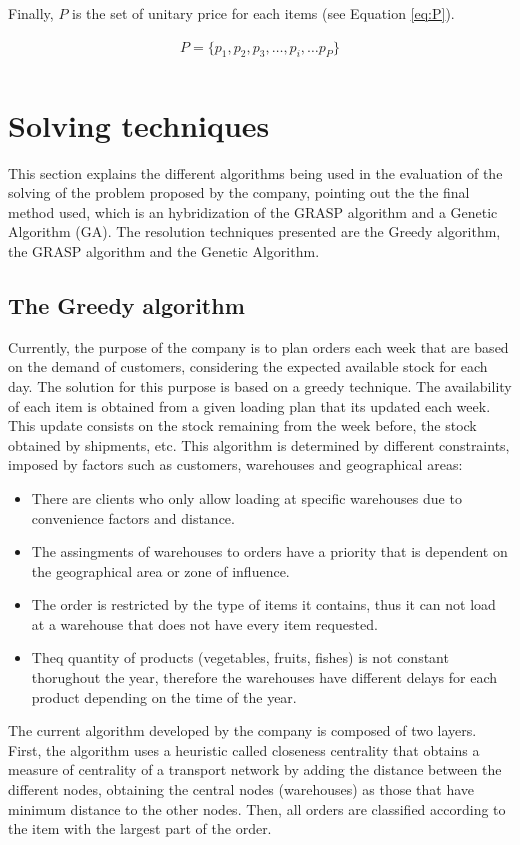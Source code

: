 \documentclass[letterpaper]{article} %
\begin{document}
Finally, $P$ is the set of unitary price for each items (see Equation \ref{eq:P}).

\begin{equation}
    \begin{aligned}\label{eq:P}
        P = \{p_1, p_2, p_3, \dots, p_i, \dots p_P \}\\
    \end{aligned}
\end{equation}


\section*{Solving techniques}

This section explains the different algorithms being used in the evaluation of the solving of the problem proposed by the company, pointing out the the final method used, which is an hybridization of the GRASP algorithm and a Genetic Algorithm (GA). The resolution techniques presented are the Greedy algorithm, the GRASP algorithm and the Genetic Algorithm.

\subsection*{The Greedy algorithm }
Currently, the purpose of the company is to plan orders each week that are based on the demand of customers, considering the expected available stock for each day. The solution for this purpose is based on a greedy technique. The availability of each item is obtained from a given loading plan that its updated each week. This update consists on the stock remaining from the week before, the stock obtained by shipments, etc. This algorithm is determined by different constraints, imposed by factors such as customers, warehouses and geographical areas:

\begin{itemize}
    \item There are clients who only allow loading at specific warehouses due to convenience factors and distance.
    \item The assingments of warehouses to orders have a priority that is dependent on the geographical area or zone of influence.
    \item The order is restricted by the type of items it contains, thus it can not load at a warehouse that does not have every item requested.
    \item Theq quantity of products (vegetables, fruits, fishes) is not constant thorughout the year, therefore the warehouses have different delays for each product depending on the time of the year.
\end{itemize}
The current algorithm developed by the company is composed of two layers. First, the algorithm uses a heuristic called closeness centrality that obtains a measure of centrality of a transport network by adding the distance between the different nodes, obtaining the central nodes (warehouses) as those that have minimum distance to the other nodes. Then, all orders are classified according to the item with the largest part of the order.
\end{document}
